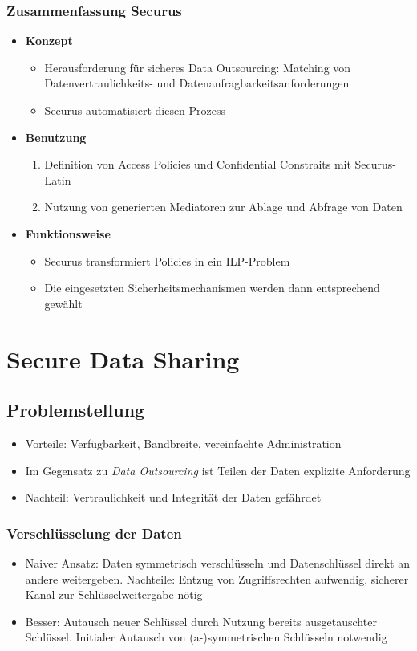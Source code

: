 \subsubsection{Zusammenfassung Securus}
\begin{itemize}
	\item \textbf{Konzept}
	\begin{itemize}
		\item Herausforderung für sicheres Data Outsourcing: Matching von Datenvertraulichkeits- und Datenanfragbarkeitsanforderungen
		\item Securus automatisiert diesen Prozess
	\end{itemize}
	\item \textbf{Benutzung}
	\begin{enumerate}
		\item Definition von Access Policies und Confidential Constraits mit Securus-Latin
		\item Nutzung von generierten Mediatoren zur Ablage und Abfrage von Daten
	\end{enumerate}
	\item \textbf{Funktionsweise}
	\begin{itemize}
		\item Securus transformiert Policies in ein ILP-Problem
		\item Die eingesetzten Sicherheitsmechanismen werden dann entsprechend gewählt
	\end{itemize}
\end{itemize}



\section{Secure Data Sharing}

\subsection{Problemstellung}
\begin{itemize}
	\item Vorteile: Verfügbarkeit, Bandbreite, vereinfachte Administration
	\item Im Gegensatz zu \textit{Data Outsourcing} ist Teilen der Daten explizite Anforderung
	\item Nachteil: Vertraulichkeit und Integrität der Daten gefährdet
\end{itemize}

\subsubsection{Verschlüsselung der Daten}
\begin{itemize}
	\item Naiver Ansatz: Daten symmetrisch verschlüsseln und Datenschlüssel direkt an andere weitergeben. Nachteile: Entzug von Zugriffsrechten aufwendig, sicherer Kanal zur Schlüsselweitergabe nötig
	\item Besser: Autausch neuer Schlüssel durch Nutzung bereits ausgetauschter Schlüssel. Initialer Autausch von (a-)symmetrischen Schlüsseln notwendig
\end{itemize}


